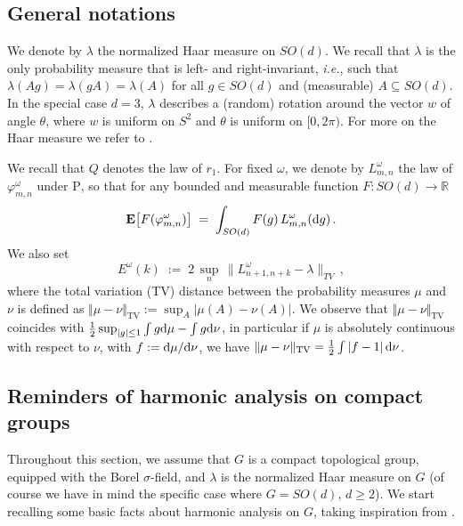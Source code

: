 \documentclass[a4paper,reqno,11pt]{amsart}
\numberwithin{equation}{section}
\newcommand{\gl}{\lambda}
\newcommand{\gs}{\sigma}
\newcommand{\gp}{\varphi}
\newcommand{\go}{\omega}
\newcommand{\dd}{\text{\rm d}}             %
\newcommand{\R}{\mathbb{R}}
\def\bP{\ensuremath{\bs{\mathrm{P}}}}
\def\bE{\ensuremath{\bs{\mathrm{E}}}}
\def\bs{\boldsymbol}
\begin{document}
\subsection{General notations}

\label{sec:notations}

We denote by $\gl$ the normalized Haar measure on $SO(d)$. We recall that $\gl$ is 
the only probability measure that is left- and right-invariant,
{\sl i.e.}, such that $\gl(A g) = \gl (gA) = \gl(A)$
for all $g \in SO(d)$ and (measurable) $A \subseteq SO(d)$.
In the special case $d=3$, $\gl$ describes a (random) rotation around the vector 
$w$ of angle $\theta$, where $w$ is uniform on $S^{2}$ and $\theta$ is uniform on $[0, 2\pi)$.
For more on the Haar measure we refer to \cite{cf:Halmos}.  

We recall that $Q$ denotes the law of $r_1$.
For fixed $\go$,
we denote by $L_{m,n}^\go$ the law of $\gp_{m,n}^\go$ under $\bP$, so that
for any bounded and measurable function $F: SO(d) \to \R$
\begin{equation}
\bE\big[ F(\gp_{m,n}^\go) \big] \;=\; \int_{SO(d)} F(g) \, L_{m,n}^\go(\dd g) \,.
\end{equation}
We also set
\begin{equation}\label{eq:Ek}
E^\go(k) \;:=\; 2 \, \sup_{n} \, \| L^\go_{n+1, n+k} - \gl \|_{TV} \,,
\end{equation}
where the total variation (TV) distance between
the probability measures $\mu$ and $\nu$  
is defined as $\Vert \mu -\nu \Vert_{\text{TV}} :=
\sup_A \vert \mu(A) -\nu (A)\vert$. We observe that
$\Vert \mu -\nu \Vert_{\text{TV}}$ coincides with
$\frac 12 \sup_{\vert g\vert \le 1}\int g \dd \mu - \int g \dd \nu$,
in particular if $\mu$ is absolutely continuous with respect to $\nu$,
with $f := \dd \mu/\dd \nu$, we have $\| \mu - \nu \|_{\text{TV}} =
\frac 12 \int |f - 1 | \, \dd \nu$.



\subsection{Reminders of harmonic analysis on compact groups}

Throughout this section, we assume that $G$ is a compact topological group,
equipped with the Borel $\gs$-field,
and $\lambda$ is the normalized Haar measure on $G$
(of course we have in mind the specific case where $G=SO(d)$, $d \ge 2$).
We start recalling some basic facts about harmonic analysis on $G$,
taking inspiration from \cite{cf:Hewitt1,cf:Hewitt2}.
\end{document}

